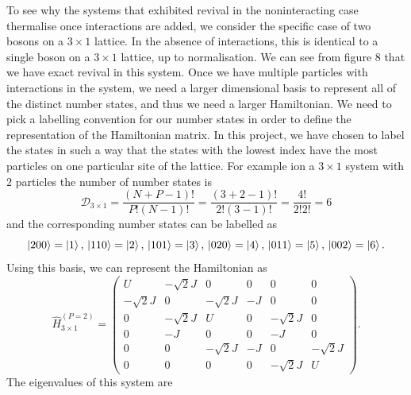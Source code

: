 \documentclass[a4paper, 10pt]{article}
\theoremstyle{plain}
\begin{document}
To see why the systems that exhibited revival in the noninteracting case
thermalise once interactions are added, we consider the specific case of
two bosons on a $3\times1$ lattice. In the absence of interactions, this
is identical to a single boson on a $3\times1$ lattice, up to normalisation.
We can see from figure $8$%
that we have exact revival
in this system. Once we have multiple particles with interactions in the system,
we need a larger dimensional basis to represent all of the distinct number
states, and thus we need a larger Hamiltonian. We need to pick a labelling
convention for our number states in order to define the representation of
the Hamiltonian matrix. In this project, we have chosen to label the states
in such a way that the states with the lowest index have the most particles on
one particular site of the lattice. For example ion a $3 \times 1$ system with
$2$ particles the number of number states is
\begin{equation*}
    \mathcal{D}_{3 \times 1} =
    \frac{(N + P - 1)!}{P! (N-1)!} =
    \frac{(3 + 2 - 1)!}{2! (3-1)!} = \frac{4!}{2! 2!} = 6
\end{equation*}
and the corresponding number states can be labelled as
\begin{equation*}
    \ket{200} = \ket{1},\,
    \ket{110} = \ket{2},\,
    \ket{101} = \ket{3},\,
    \ket{020} = \ket{4},\,
    \ket{011} = \ket{5},\,
    \ket{002} = \ket{6}.
\end{equation*}
Using this basis, we can represent the Hamiltonian as
\begin{equation}
    \hat{H}_{3\times1}^{\left(P=2\right)}
    =
    \begin{pmatrix}
             U & -\sqrt{2}J &          0 &   0 &          0 &          0 \\
    -\sqrt{2}J &          0 & -\sqrt{2}J &  -J &          0 &          0 \\
             0 & -\sqrt{2}J &          U &   0 & -\sqrt{2}J &          0 \\
             0 &         -J &          0 &   0 &         -J &          0 \\
             0 &          0 & -\sqrt{2}J &  -J &          0 & -\sqrt{2}J \\
             0 &          0 &          0 &   0 & -\sqrt{2}J &          U
    \end{pmatrix}.
\end{equation}
The eigenvalues of this system are
\end{document}
